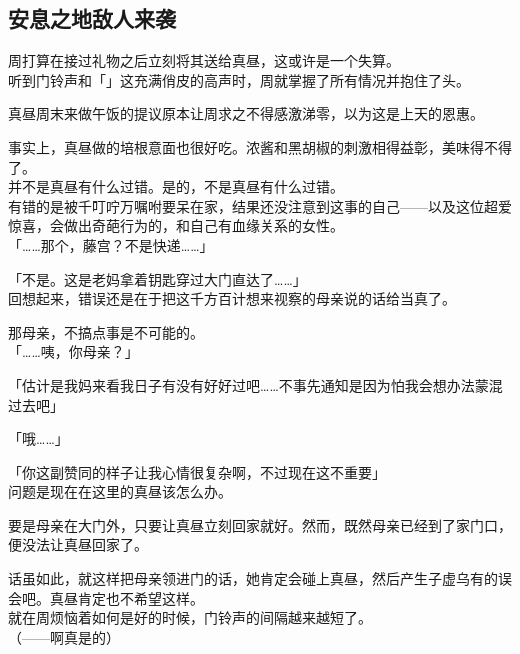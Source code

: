 \subsection{安息之地敌人来袭}

周打算在接过礼物之后立刻将其送给真昼，这或许是一个失算。\\

听到门铃声和「」这充满俏皮的高声时，周就掌握了所有情况并抱住了头。\\

\vspace{2\baselineskip}

真昼周末来做午饭的提议原本让周求之不得感激涕零，以为这是上天的恩惠。

事实上，真昼做的培根意面也很好吃。浓酱和黑胡椒的刺激相得益彰，美味得不得了。\\

并不是真昼有什么过错。是的，不是真昼有什么过错。\\

有错的是被千叮咛万嘱咐要呆在家，结果还没注意到这事的自己——以及这位超爱惊喜，会做出奇葩行为的，和自己有血缘关系的女性。\\

「……那个，藤宫？不是快递……」

「不是。这是老妈拿着钥匙穿过大门直达了……」\\

回想起来，错误还是在于把这千方百计想来视察的母亲说的话给当真了。

那母亲，不搞点事是不可能的。\\

「……咦，你母亲？」

「估计是我妈来看我日子有没有好好过吧……不事先通知是因为怕我会想办法蒙混过去吧」

「哦……」

「你这副赞同的样子让我心情很复杂啊，不过现在这不重要」\\

问题是现在在这里的真昼该怎么办。

要是母亲在大门外，只要让真昼立刻回家就好。然而，既然母亲已经到了家门口，便没法让真昼回家了。

话虽如此，就这样把母亲领进门的话，她肯定会碰上真昼，然后产生子虚乌有的误会吧。真昼肯定也不希望这样。\\

就在周烦恼着如何是好的时候，门铃声的间隔越来越短了。\\

（——啊真是的）

